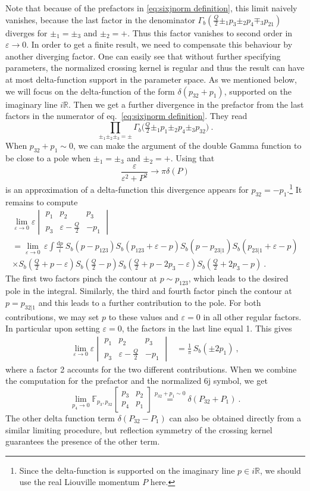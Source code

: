 \documentclass[12pt,a4paper]{article}
\newcommand{\be}{\begin{equation}}
\newcommand{\ee}{\end{equation}}
\newcommand\RR{\mathbb{R}}
\newcommand{\sixjnorm}[6]{\begin{vmatrix}
#1 & #2 & #3 \\
#4 & #5 & #6
\end{vmatrix}
}
\begin{document}
Note that because of the prefactors in \eqref{eq:sixjnorm definition}, this limit naively vanishes, because the last factor in the denominator $\Gamma_b(\frac{Q}{2}\pm_1 p_3\pm_2 p_4 \mp_3 p_{21})$ diverges for $\pm_1=\pm_3$ and $\pm_2=+$. Thus this factor vanishes to second order in $\varepsilon \to 0$. In order to get a finite result, we need to compensate this behaviour by another diverging factor. One can easily see that without further specifying parameters, the normalized crossing kernel is regular and thus the result can have at most delta-function support in the parameter space. As we mentioned below, we will focus on the delta-function of the form $\delta(p_{32}+p_1)$, supported on the imaginary line $i \RR$.
Then we get a further divergence in the prefactor from the last factors in the numerator of eq.~\eqref{eq:sixjnorm definition}. They read
\be  
\prod_{\pm_1 \pm_2 \pm_3=\pm} \Gamma_b\big(\tfrac{Q}{2}\pm_1p_1\pm_2p_4\pm_3p_{32})\ .
\ee
When $p_{32} +p_1 \sim 0$, we can make the argument of the double Gamma function to be close to a pole when $\pm_1=\pm_3$ and $\pm_2=+$. Using that
\be  
\frac{\varepsilon}{\varepsilon^2+P^2} \longrightarrow \pi \delta(P)
\ee
is an approximation of a delta-function this divergence appears for $p_{32}=-p_1$.\footnote{Since the delta-function is supported on the imaginary line $p \in i \RR$, we should use the real Liouville momentum $P$ here.} It remains to compute
\begin{multline} 
\lim_{\varepsilon \to 0} \varepsilon \sixjnorm{p_1}{p_2}{p_3}{p_3}{\varepsilon-\frac{Q}{2}}{-p_1}\\
=\lim_{\varepsilon \to 0} \, \varepsilon \int \frac{\mathrm{d}p}{i} \ S_b(p-p_{123})S_b(p_{123}+\varepsilon-p)S_b(p-p_{23|1})S_b(p_{23|1}+\varepsilon-p)  \\
\times S_b(\tfrac{Q}{2}+p-\varepsilon)S_b(\tfrac{Q}{2}-p) S_b(\tfrac{Q}{2}+p-2p_3-\varepsilon)S_b(\tfrac{Q}{2}+2p_3-p)  \ .
\end{multline}
The first two factors pinch the contour at $p\sim p_{123}$, which leads to the desired pole in the integral. Similarly, the third and fourth factor pinch the contour at $p=p_{32|1}$ and this leads to a further contribution to the pole. For both contributions, we may set $p$ to these values and $\varepsilon=0$ in all other regular factors. In particular upon setting $\varepsilon=0$, the factors in the last line equal 1.
This gives
\begin{align}
\lim_{\varepsilon \to 0} \varepsilon \sixjnorm{p_1}{p_2}{p_3}{p_3}{\varepsilon-\frac{Q}{2}}{-p_1}&=\frac{1}{\pi} \, S_b(\pm 2 p_1)\ ,
\end{align}
where a factor 2 accounts for the two different contributions. When we combine the computation for the prefactor and the normalized 6j symbol, we get
\be  
\lim_{p_4 \to 0} \mathbb{F}_{p_{3},p_{32}}\!\begin{bmatrix}
    p_3 & p_2 \\ p_4 & p_1
\end{bmatrix}\overset{p_{32}+p_1 \sim 0}{=}\delta(P_{32}+P_1)\ .
\ee
The other delta function term $\delta(P_{32}-P_1)$ can also be obtained directly from a similar limiting procedure, but reflection symmetry of the crossing kernel guarantees the presence of the other term.
\end{document}
